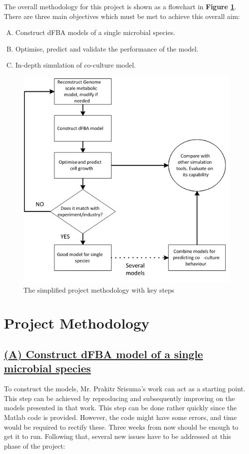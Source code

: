 \documentclass[11pt,a4paper,english]{article}
\begin{document}
The overall methodology for this project is shown as a flowchart in \textbf{Figure \ref{fig:my_label}}. There are three main objectives which must be met to achieve this overall aim:
\begin{enumerate} [(A)]
    \item Construct dFBA models of a single microbial species.
    \item Optimise, predict and validate the performance of the model.
    \item In-depth simulation of co-culture model.
\end{enumerate}
\begin{figure}[ht]
    \centering
    \includegraphics[width=12cm]{projectmethodology.png}
    \caption{The simplified project methodology with key steps}
    \label{fig:my_label}
\end{figure}

\section*{Project Methodology}
\subsection*{\underline{(A) Construct dFBA model of a single microbial species}}
\label{sec:subsecA}
To construct the models, Mr. Prakitr Srisuma’s work can act as a starting point\citep{Srisuma2018}. This step can be achieved by reproducing and subsequently improving on the models presented in that work. This step can be done rather quickly since the Matlab code is provided. However, the code might have some errors, and time would be required to rectify these. Three weeks from now should be enough to get it to run. Following that, several new issues have to be addressed at this phase of the project:
\end{document}
